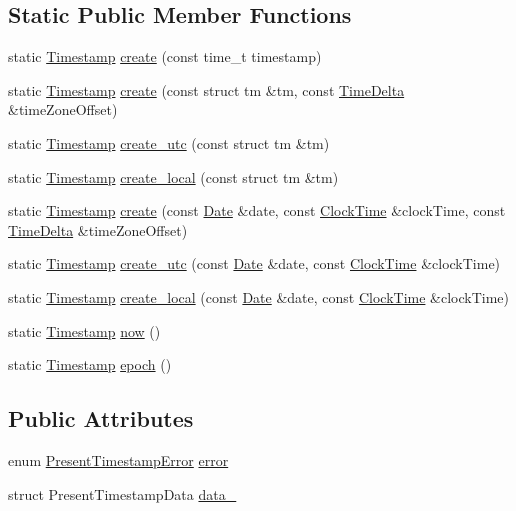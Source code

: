 \subsection*{\-Static \-Public \-Member \-Functions}
\begin{DoxyCompactItemize}
\item 
static \hyperlink{structTimestamp}{\-Timestamp} \hyperlink{structTimestamp_a050609c408bf55dafa24a080757a471b}{create} (const time\-\_\-t timestamp)
\item 
static \hyperlink{structTimestamp}{\-Timestamp} \hyperlink{structTimestamp_aa5ab499f6e8a649ba6a160593dce9600}{create} (const struct tm \&tm, const \hyperlink{structTimeDelta}{\-Time\-Delta} \&time\-Zone\-Offset)
\item 
static \hyperlink{structTimestamp}{\-Timestamp} \hyperlink{structTimestamp_ae1ec817a76d5f43941548b9cccf3bdeb}{create\-\_\-utc} (const struct tm \&tm)
\item 
static \hyperlink{structTimestamp}{\-Timestamp} \hyperlink{structTimestamp_ae2d7fea77bd2f2c7ca3343be080dd90f}{create\-\_\-local} (const struct tm \&tm)
\item 
static \hyperlink{structTimestamp}{\-Timestamp} \hyperlink{structTimestamp_a0585a5f7928f6bad9dda69eb5adf99ee}{create} (const \hyperlink{structDate}{\-Date} \&date, const \hyperlink{structClockTime}{\-Clock\-Time} \&clock\-Time, const \hyperlink{structTimeDelta}{\-Time\-Delta} \&time\-Zone\-Offset)
\item 
static \hyperlink{structTimestamp}{\-Timestamp} \hyperlink{structTimestamp_af18efc9b0db5803b00019e6e3f01895a}{create\-\_\-utc} (const \hyperlink{structDate}{\-Date} \&date, const \hyperlink{structClockTime}{\-Clock\-Time} \&clock\-Time)
\item 
static \hyperlink{structTimestamp}{\-Timestamp} \hyperlink{structTimestamp_acaa4f082d3a38dc42c8d815925add8a5}{create\-\_\-local} (const \hyperlink{structDate}{\-Date} \&date, const \hyperlink{structClockTime}{\-Clock\-Time} \&clock\-Time)
\item 
static \hyperlink{structTimestamp}{\-Timestamp} \hyperlink{structTimestamp_ab2b17140c0c966ad672395f3f90b8653}{now} ()
\item 
static \hyperlink{structTimestamp}{\-Timestamp} \hyperlink{structTimestamp_aa2f108710dbe1372d8fc7146a2e66c37}{epoch} ()
\end{DoxyCompactItemize}
\subsection*{\-Public \-Attributes}
\begin{DoxyCompactItemize}
\item 
enum \hyperlink{timestamp_8h_a460efbc7c0b935c6b51d98b8295e8dc0}{\-Present\-Timestamp\-Error} \hyperlink{structTimestamp_a2ac4b53468d2a270e2ba5f05af9d7472}{error}
\item 
struct \-Present\-Timestamp\-Data \hyperlink{structTimestamp_adf3177050edc50aa8b6e768922e4cf56}{data\-\_\-}
\end{DoxyCompactItemize}
